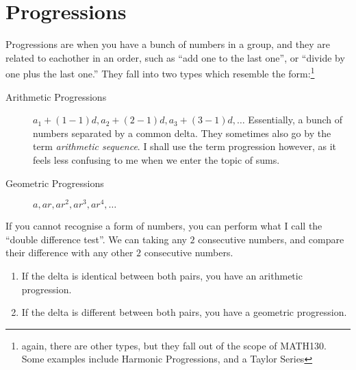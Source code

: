 \chapter{Progressions}
\label{chap:Progressions}
Progressions are when you have a bunch of numbers in a group, and they are
related to eachother in an order, such as ``add one to the last one'', or
``divide by one plus the last one.'' They fall into two types which resemble the
form:\footnote{again, there are other types, but they fall out of the scope of
MATH130. Some examples include Harmonic Progressions, and a Taylor Series}

\begin{description}
  \item[Arithmetic Progressions] $a_1 + (1-1)d, a_2 + (2-1)d, a_3 +(3-1)d,
  \ldots$ Essentially, a bunch of numbers separated by a common delta. They
  sometimes also go by the term \emph{arithmetic sequence}. I shall use the term
  progression however, as it feels less confusing to me when we enter the topic
  of sums.
  \item[Geometric Progressions] $a, ar, ar^2, ar^3, ar^4, \ldots$
\end{description}
If you cannot recognise a form of numbers, you can perform what I call the
``double difference test''. We can taking any $2$ consecutive numbers, and
compare their difference with any other $2$ consecutive numbers.
\begin{enumerate}
  \item If the delta is identical between both pairs, you have an arithmetic
  progression.
  \item If the delta is different between both pairs, you have a geometric
  progression.
\end{enumerate}


